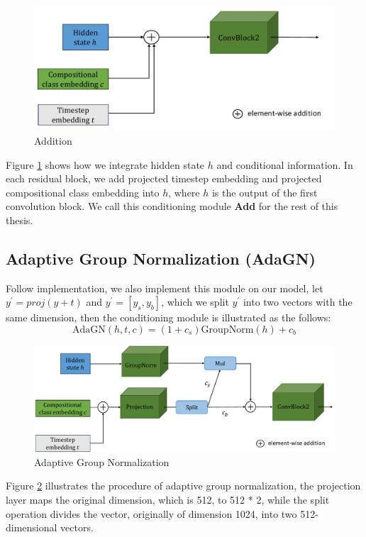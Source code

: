 \begin{figure} [H]
    \centering
    \includegraphics[width=0.8\linewidth]{figures/Add.pdf}
    \caption{Addition}
    \label{fig:add}
\end{figure}
Figure \ref{fig:add} shows how we integrate hidden state $h$ and conditional information. In each residual block, we add projected timestep embedding and projected compositional class embedding into $h$, where $h$ is the output of the first convolution block. We call this conditioning module \textbf{Add} for the rest of this thesis.
\subsection{Adaptive Group Normalization (AdaGN)}
Follow \cite{nichol2021improved} implementation, we also implement this module on our model, let $y^{\prime} = proj(y + t)$ and $y^{\prime} = [y_s, y_b]$, which we split $y^{\prime}$ into two vectors with the same dimension, then the conditioning module is illustrated as the follows:
\begin{equation}
    \text{AdaGN}(h, t, c) = (1 + c_s)\text{GroupNorm}(h) + c_b
\end{equation}
\begin{figure} [H]
    \centering
    \includegraphics[width=0.8\linewidth]{figures/AdaGN.pdf}
    \caption{Adaptive Group Normalization}
    \label{fig:adagn}
\end{figure}
Figure \ref{fig:adagn} illustrates the procedure of adaptive group normalization, the projection layer maps the original dimension, which is 512, to 512 * 2, while the split operation divides the vector, originally of dimension 1024, into two 512-dimensional vectors.

